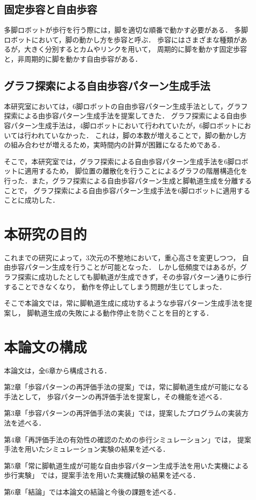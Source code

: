 \subsection{固定歩容と自由歩容}
多脚ロボットが歩行を行う際には，脚を適切な順番で動かす必要がある．
多脚ロボットにおいて，脚の動かし方を歩容と呼ぶ．
歩容にはさまざまな種類があるが，大きく分別するとカムやリンクを用いて，
周期的に脚を動かす固定歩容と，非周期的に脚を動かす自由歩容がある．

\subsection{グラフ探索による自由歩容パターン生成手法}
本研究室においては，6脚ロボットの自由歩容パターン生成手法として，グラフ探索による由歩容パターン生成手法を提案してきた．
グラフ探索による自由歩容パターン生成手法は，4脚ロボットにおいて行われていたが，6脚ロボットにおいては行われていなかった．
これは，脚の本数が増えることで，脚の動かし方の組み合わせが増えるため，実時間内の計算が困難になるためである．

そこで，本研究室では，グラフ探索による自由歩容パターン生成手法を6脚ロボットに適用するため，
脚位置の離散化を行うことによるグラフの階層構造化を行った．また，グラフ探索による自由歩容パターン生成と脚軌道生成を分離することで，
グラフ探索による自由歩容パターン生成手法を6脚ロボットに適用することに成功した．

\section{本研究の目的}
これまでの研究によって，3次元の不整地において，重心高さを変更しつつ，
自由歩容パターン生成を行うことが可能となった．
しかし低頻度ではあるが，グラフ探索に成功したとしても脚軌道が生成できず，その歩容パターン通りに歩行することできなくなり，
動作を停止してしまう問題が生じてしまった．

そこで本論文では，常に脚軌道生成に成功するような歩容パターン生成手法を提案し，
脚軌道生成の失敗による動作停止を防ぐことを目的とする．

\section{本論文の構成}
本論文は，全6章から構成される．

第2章「歩容パターンの再評価手法の提案」では，常に脚軌道生成が可能になる手法として，
歩容パターンの再評価手法を提案し，その機能を述べる．

第3章「歩容パターンの再評価手法の実装」では，提案したプログラムの実装方法を述べる．

第4章「再評価手法の有効性の確認のための歩行シミュレーション」では，
提案手法を用いたシミュレーション実験の結果を述べる．

第5章「常に脚軌道生成が可能な自由歩容パターン生成手法を用いた実機による歩行実験」
では，提案手法を用いた実機試験の結果を述べる．

第6章「結論」では本論文の結論と今後の課題を述べる．
